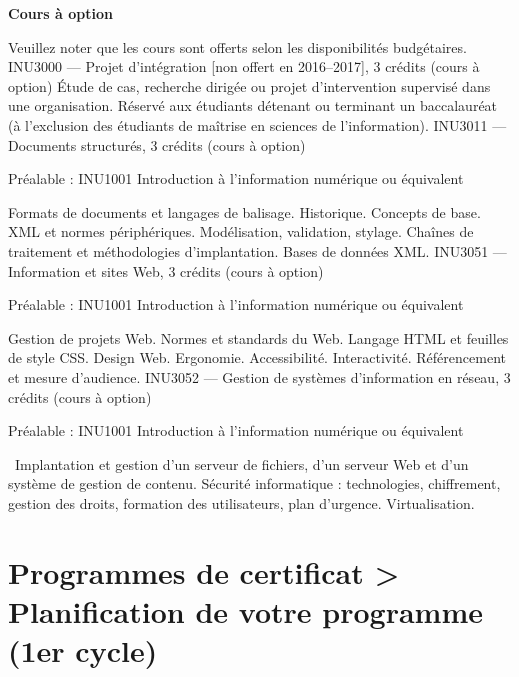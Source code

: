 \documentclass [12 pt]{article}
\begin{document}
        \textbf{
        Cours à option
        }
    
            Veuillez noter que les cours sont offerts selon les disponibilités budgétaires.
            INU3000 — Projet d'intégration [non offert en 2016–2017], 3 crédits (cours à
                option)
            Étude de cas, recherche dirigée ou projet d'intervention supervisé dans une
                organisation. Réservé aux étudiants détenant ou terminant un baccalauréat (à
                l'exclusion des étudiants de maîtrise en sciences de l'information).
            INU3011 — Documents structurés, 3 crédits (cours à option)
            
                Préalable : INU1001 Introduction à l'information numérique ou équivalent
            
            Formats de documents et langages de balisage. Historique. Concepts de base. XML et
                normes périphériques. Modélisation, validation, stylage. Chaînes de traitement et
                méthodologies d'implantation. Bases de données XML.
            INU3051 — Information et sites Web, 3 crédits (cours à option)
            
                Préalable : INU1001 Introduction à l'information numérique ou équivalent
            
            Gestion de projets Web. Normes et standards du Web. Langage HTML et feuilles de style
                CSS. Design Web. Ergonomie. Accessibilité. Interactivité. Référencement et mesure
                d'audience.
            INU3052 — Gestion de systèmes d'information en réseau, 3 crédits (cours à
                option)
            
                Préalable : INU1001 Introduction à l'information numérique ou équivalent
            
             Implantation et gestion d'un serveur de fichiers, d'un serveur Web et d'un
                système de gestion de contenu. Sécurité informatique : technologies, chiffrement,
                gestion des droits, formation des utilisateurs, plan d'urgence. Virtualisation.
        
    
    
        \newpage
        \section {
        Programmes de certificat > Planification de votre programme (1er cycle)
        }
        
\end{document}
